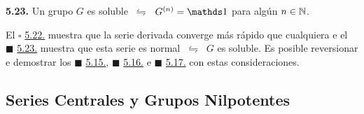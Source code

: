 \hypertarget{thm223}{}
\begin{theorem}
    \textbf{5.23.} Un grupo \(G\) es soluble \(\ \leftrightharpoons \ \) \(G^{(n)} = \id\) para algún \(n \in \mathbb{N}\). 
\end{theorem}


\begin{note}
    El {\scriptsize\(\square\)} \hyperlink{lemma522}{5.22.} muestra que la serie derivada converge más rápido que cualquiera e el \(\blacksquare\) \hyperlink{thm523}{5.23.} muestra que esta serie es normal \(\ \leftrightharpoons \ \) \(G\) es soluble. Es posible reversionar e demostrar los \(\blacksquare\) \hyperlink{thm515}{5.15.}, \(\blacksquare\) \hyperlink{thm516}{5.16.} e \(\blacksquare\) \hyperlink{thm517}{5.17.} con estas consideraciones. 
\end{note}

%
%

\subsection*{Series Centrales y Grupos Nilpotentes}

